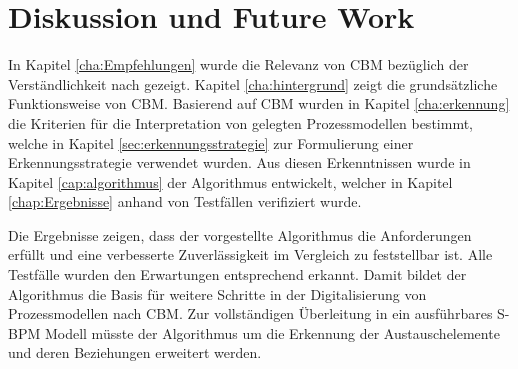 %
%
% 
% 
% 


\chapter{Diskussion und Future Work}
\label{chap:Diskussion}
In Kapitel \ref{cha:Empfehlungen} wurde die Relevanz von CBM bezüglich der Verständlichkeit nach \citet{MENDLING2010127} gezeigt. Kapitel \ref{cha:hintergrund} zeigt die grundsätzliche Funktionsweise von CBM. Basierend auf CBM wurden in Kapitel \ref{cha:erkennung} die Kriterien für die Interpretation von gelegten Prozessmodellen bestimmt, welche in Kapitel \ref{sec:erkennungsstrategie} zur Formulierung einer Erkennungsstrategie verwendet wurden. Aus diesen Erkenntnissen wurde in Kapitel \ref{cap:algorithmus} der Algorithmus entwickelt, welcher in Kapitel \ref{chap:Ergebnisse} anhand von Testfällen verifiziert wurde. 

Die Ergebnisse zeigen, dass der vorgestellte Algorithmus die Anforderungen erfüllt und eine verbesserte Zuverlässigkeit im Vergleich zu \citet{max} feststellbar ist. Alle Testfälle wurden den Erwartungen entsprechend erkannt. Damit bildet der Algorithmus die Basis für weitere Schritte in der Digitalisierung von Prozessmodellen nach CBM. Zur vollständigen Überleitung in ein ausführbares S-BPM Modell müsste der Algorithmus um die Erkennung der Austauschelemente und deren Beziehungen erweitert werden. 